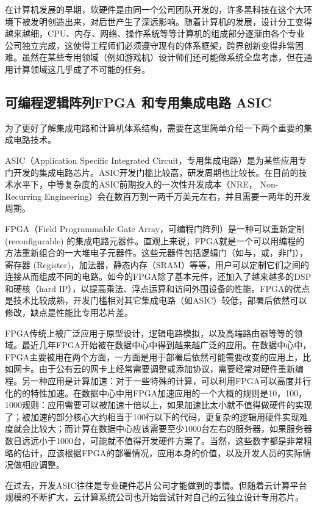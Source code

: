 在计算机发展的早期，软硬件是由同一个公司团队开发的，许多黑科技在这个大环境下被发明创造出来，对后世产生了深远影响。随着计算机的发展，设计分工变得越来越细，CPU、内存、网络、操作系统等等计算机的组成部分逐渐由各个专业公司独立完成，这使得工程师们必须遵守现有的体系框架，跨界创新变得非常困难。虽然在某些专用领域（例如游戏机）设计师们还可能做系统全盘考虑，但在通用计算领域这几乎成了不可能的任务。


\subsection{可编程逻辑阵列FPGA 和专用集成电路 ASIC}

为了更好了解集成电路和计算机体系结构，需要在这里简单介绍一下两个重要的集成电路技术。

ASIC（Application Specific Integrated Circuit，专用集成电路）是为某些应用专门开发的集成电路芯片。ASIC开发门槛比较高，研发周期也比较长。在目前的技术水平下，中等复杂度的ASIC前期投入的一次性开发成本（NRE， Non-Recurring Engineering）会在数百万到一两千万美元左右，并且需要一两年的开发周期。

FPGA（Field Programmable Gate Array，可编程门阵列）是一种可以重新定制 (reconfigurable) 的集成电路元器件。直观上来说，FPGA就是一个可以用编程的方法重新组合的一大堆电子元器件。这些元器件包括逻辑门（如与，或，非门），寄存器 (Register)，加法器，静态内存（SRAM）等等，用户可以定制它们之间的连接从而组成不同的电路。如今的FPGA除了基本元件，还加入了越来越多的DSP和硬核（hard IP），以提高乘法、浮点运算和访问外围设备的性能。FPGA的优点是技术比较成熟，开发门槛相对其它集成电路（如ASIC）较低，部署后依然可以修改，缺点是性能比专用芯片差。

FPGA传统上被广泛应用于原型设计，逻辑电路模拟，以及高端路由器等等的领域。最近几年FPGA开始被在数据中心中得到越来越广泛的应用。在数据中心中，FPGA主要被用在两个方面，一方面是用于部署后依然可能需要改变的应用上，比如网卡。由于公有云的网卡上经常需要调整或添加协议，需要经常对硬件重新编程。另一种应用是计算加速：对于一些特殊的计算，可以利用FPGA可以高度并行化的的特性加速。在数据中心中用FPGA加速应用的一个大概的规则是10，100，1000规则：应用需要可以被加速十倍以上，如果加速比太小就不值得做硬件的实现了；被加速的部分核心大约相当于100行以下的代码，更复杂的逻辑用硬件实现难度就会比较大；而计算在数据中心应该需要至少1000台左右的服务器，如果服务器数目远远小于1000台，可能就不值得开发硬件方案了。当然，这些数字都是非常粗略的估计，应该根据FPGA的部署情况，应用本身的价值，以及开发人员的实际情况做相应调整。

在过去，开发ASIC往往是专业硬件芯片公司才能做到的事情。但随着云计算平台规模的不断扩大，云计算系统公司也开始尝试针对自己的云独立设计专用芯片。
\fi

